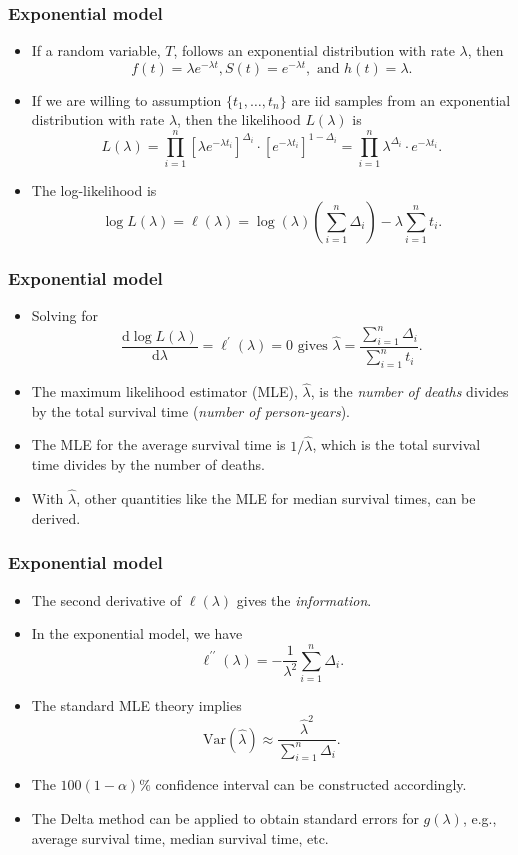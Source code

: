 \documentclass[10pt]{beamer}\usepackage[]{graphicx}\usepackage[]{color}
\newcommand{\dif}{\mathrm{d}}
\newcommand{\empr}[1]{{\emph{\color{red}#1}}}
\newcommand{\Var}{\mathrm{Var}}
\begin{document}
\begin{frame}
  \frametitle{Exponential model}
  \begin{itemize}
  \item If a random variable, $T$, follows an exponential distribution with rate $\lambda$, then
    $$f(t) = \lambda e^{-\lambda t}, S(t) = e^{-\lambda t}, \mbox{ and } h(t) = \lambda.$$
  \item If we are willing to assumption $\{t_1, \ldots, t_n\}$ are iid samples from 
    an exponential distribution with rate $\lambda$, then the likelihood $L(\lambda)$ is 
    $$ L(\lambda) = \prod_{i = 1}^n\left[\lambda e^{-\lambda t_i} \right]^{\Delta_i} \cdot \left[ e^{-\lambda t_i}\right]^{1 - \Delta_i} = \prod_{i =1 }^n\lambda^{\Delta_i}\cdot e^{-\lambda t_i}.$$
  \item The log-likelihood is
    $$\log L(\lambda) = \ell(\lambda)= \log(\lambda)\left(\sum_{i = 1}^n\Delta_i\right) - \lambda\sum_{i = 1}^nt_i.$$
  \end{itemize}  
\end{frame}

\begin{frame}
  \frametitle{Exponential model}
  \begin{itemize}
  \item Solving for
    $$\frac{\dif \log L(\lambda)}{\dif \lambda} = \ell^\prime(\lambda) = 0 \mbox{ gives } \hat\lambda = \frac{\sum_{i = 1}^n\Delta_i}{\sum_{i = 1}^nt_i}.$$
  \item The maximum likelihood estimator (MLE), $\hat\lambda$, is the \empr{number of deaths} divides by the total survival time (\empr{number of person-years}).
  \item The MLE for the average survival time is $1 / \hat\lambda$, 
    which is the total survival time divides by the number of deaths. 
  \item With $\hat\lambda$, other quantities like the MLE for median survival times, can be derived. 
  \end{itemize}  
\end{frame}

\begin{frame}
  \frametitle{Exponential model}
  \begin{itemize}
  \item The second derivative of $\ell(\lambda)$ gives the \empr{information}.
  \item In the exponential model, we have 
    $$\ell^{\prime\prime}(\lambda) = -\frac{1}{\lambda^2}\sum_{i = 1}^n\Delta_i.$$
  \item The standard MLE theory implies
    $$\Var(\hat\lambda) \approx \frac{\hat\lambda^2}{\sum_{i = 1}^n\Delta_i}.$$
  \item The $100 (1 - \alpha)\%$ confidence interval can be constructed accordingly.
  \item The Delta method can be applied to obtain standard errors for $g(\lambda)$,
    e.g., average survival time, median survival time, etc.
  \end{itemize}  
\end{frame}
\end{document}

